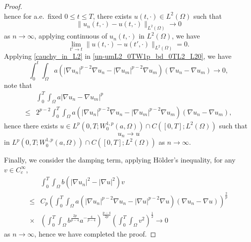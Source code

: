 \documentclass[11pt]{amsart}
\theoremstyle{definition}
\numberwithin{equation}{section}
\newcommand*\abs[1]{\lvert#1\rvert}
\newcommand*\norm[1]{\lVert#1\rVert}
\begin{document}
\begin{proof}
\begin{equation}
	\end{equation}
	hence for a.e.\ fixed $0 \leq t \leq T$, there exists
	$u(t,\cdot) \in L^2(\Omega)$ such that
	\begin{equation}
		\norm{u_n(t,\cdot)-u(t,\cdot)}_{L^2(\Omega)} \to 0
	\end{equation}
	as $n \to \infty$, applying continuous of $u_n(t, \cdot)$
	in $L^2(\Omega)$, we have
	\begin{equation}
		\lim_{t' \to t}\norm{u(t,\cdot)-u(t',\cdot)}_{L^2(\Omega)}=0.
	\end{equation}
	Applying \cref{cauchy_in_L2} in \cref{un-umL2_0TW1p_bd_0TL2_L20},
	we have
	\begin{equation}\label{cauchy_in_W1pa}
		\int_{0}^{t}\int_{\Omega}a
		\left(\abs{\nabla u_n}^{p-2}\nabla u_n
		- \abs{\nabla u_m}^{p-2}\nabla u_m\right)
		\left(\nabla u_n - \nabla u_m\right)
		\to 0,
	\end{equation}
	note that
	\begin{equation}
		\begin{split}
			& \int_0^T\int_{\Omega}a\abs{\nabla u_n - \nabla u_m}^p\\
			\leq{} & 2^{p-2}\int_{0}^{T}\int_{\Omega}a
			\left(\abs{\nabla u_n}^{p-2}\nabla u_n
			- \abs{\nabla u_m}^{p-2}\nabla u_m\right)
			\left(\nabla u_n - \nabla u_m\right),
		\end{split}
	\end{equation}
	hence there exists $u \in L^p(0, T; W_0^{1,p}(a,\Omega))
	\cap C([0, T]; L^2(\Omega))$ such that
	\begin{equation}
		u_{n} \to u
	\end{equation}
	in $L^p(0, T; W_0^{1,p}(a,\Omega))\cap C([0, T]; L^2(\Omega))$
	as $n \to \infty$.

	Finally, we consider the damping term, applying H\"older's inequality,
	for any $v \in C_c^\infty$,
	\begin{equation}
		\begin{split}
			& \int_0^T\int_{\Omega}b\left(\abs{\nabla u_n}^2
			- \abs{\nabla u}^2\right)v\\
			\leq{} & C_p\left(\int_0^T\int_{\Omega}a
			\left(\abs{\nabla u_n}^{p-2}\nabla u_n
			- \abs{\nabla u}^{p-2}\nabla u\right)
			\left(\nabla u_n - \nabla u\right)\right)^{\frac{2}{p}}\\
			\times{} & \left(\int_0^T\int_{\Omega}b^{\frac{2p}{p-4}}a^{-\frac{4}{p-4}}\right)^{\frac{p-4}{2p}}
			\left(\int_0^T\int_{\Omega}v^2\right)^{\frac{1}{2}} \to 0
		\end{split}
	\end{equation}
	as $n \to \infty$, hence we have completed the proof.
\end{proof}
\end{document}
